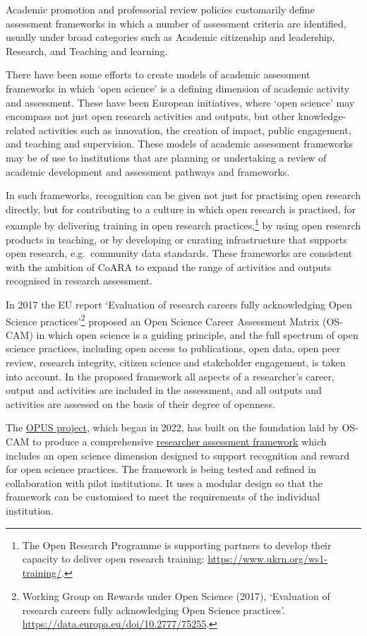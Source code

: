 \documentclass[
  letterpaper,
  DIV=11,
  numbers=noendperiod,
  oneside]{scrreprt}
\begin{document}
Academic promotion and professorial review policies customarily define
assessment frameworks in which a number of assessment criteria are
identified, usually under broad categories such as Academic citizenship
and leadership, Research, and Teaching and learning.

There have been some efforts to create models of academic assessment
frameworks in which `open science' is a defining dimension of academic
activity and assessment. These have been European initiatives, where
`open science' may encompass not just open research activities and
outputs, but other knowledge-related activities such as innovation, the
creation of impact, public engagement, and teaching and supervision.
These models of academic assessment frameworks may be of use to
institutions that are planning or undertaking a review of academic
development and assessment pathways and frameworks.

In such frameworks, recognition can be given not just for practising
open research directly, but for contributing to a culture in which open
research is practised, for example by delivering training in open
research practices,\footnote{The Open Research Programme is supporting
  partners to develop their capacity to deliver open research training:
  \url{https://www.ukrn.org/ws1-training/}.} by using open research
products in teaching, or by developing or curating infrastructure that
supports open research, e.g.~community data standards. These frameworks
are consistent with the ambition of CoARA to expand the range of
activities and outputs recognised in research assessment.

In 2017 the EU report `Evaluation of research careers fully
acknowledging Open Science practices'\footnote{Working Group on Rewards
  under Open Science (2017), `Evaluation of research careers fully
  acknowledging Open Science practices'.
  \url{https://data.europa.eu/doi/10.2777/75255}.} proposed an Open
Science Career Assessment Matrix (OS-CAM) in which open science is a
guiding principle, and the full spectrum of open science practices,
including open access to publications, open data, open peer review,
research integrity, citizen science and stakeholder engagement, is taken
into account. In the proposed framework all aspects of a researcher's
career, output and activities are included in the assessment, and all
outputs and activities are assessed on the basis of their degree of
openness.

The \href{https://opusproject.eu/}{OPUS project}, which began in 2022,
has built on the foundation laid by OS-CAM to produce a comprehensive
\href{https://opusproject.eu/wp-content/uploads/2023/09/OPUS_D3.1_IndicatorsMetrics_FINAL_PUBLIC.pdf}{researcher
assessment framework} which includes an open science dimension designed
to support recognition and reward for open science practices. The
framework is being tested and refined in collaboration with pilot
institutions. It uses a modular design so that the framework can be
customised to meet the requirements of the individual institution.
\end{document}
